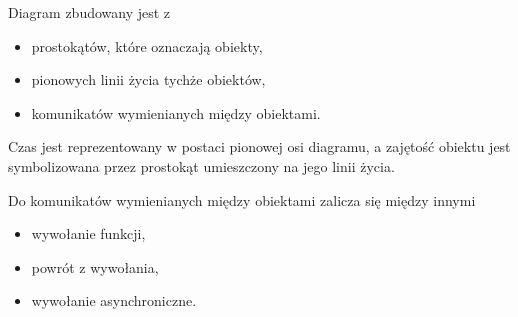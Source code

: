 Diagram zbudowany jest z
\begin{itemize}
	\item{prostokątów, które oznaczają obiekty,}
	\item{pionowych linii życia tychże obiektów,}
	\item{komunikatów wymienianych między obiektami.}
\end{itemize}

Czas jest reprezentowany w postaci pionowej osi diagramu, a zajętość obiektu jest symbolizowana przez prostokąt umieszczony na jego linii życia.

Do komunikatów wymienianych między obiektami zalicza się między innymi
\begin{itemize}
	\item{wywołanie funkcji,}
	\item{powrót z wywołania,}
	\item{wywołanie asynchroniczne.}
\end{itemize}






